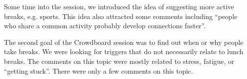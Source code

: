 Some time into the session, we introduced the idea of suggesting more active breaks, e.g. sports. This idea also attracted some comments including ``people who share a common activity probably develop
connections faster''.

The second goal of the Crowdboard session was to find out when or why people take breaks. We were looking for triggers that do not necessarily relate to lunch breaks. The comments on this topic were mostly related to stress, fatigue, or ``getting stuck''. There were only a few comments on this topic.

